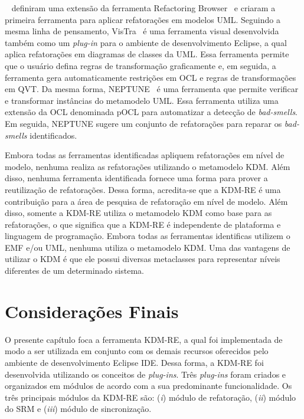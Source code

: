 ~ definiram uma extensão da ferramenta Refactoring Browser~\cite{roberts1997refactoring} e criaram a primeira ferramenta para aplicar refatorações em modelos UML. Seguindo a mesma linha de pensamento,
VisTra~\cite{vstolc2010visual} é uma ferramenta visual desenvolvida também como um \textit{plug-in} para o ambiente de desenvolvimento Eclipse, a qual aplica refatorações em diagramas de classes da UML. Essa ferramenta permite que o usuário defina regras de transformação graficamente e, em seguida, a ferramenta gera automaticamente restrições em OCL e regras de transformações em QVT. Da mesma forma, NEPTUNE~\cite{millan2009ocl} é uma ferramenta que permite verificar e transformar instâncias do metamodelo UML. Essa ferramenta utiliza uma extensão da OCL denominada pOCL para automatizar a detecção de \textit{bad-smells}. Em seguida, NEPTUNE sugere um conjunto de refatorações para reparar os \textit{bad-smells} identificados. 

Embora todas as ferramentas identificadas apliquem refatorações em nível de modelo, nenhuma realiza as refatorações utilizando o metamodelo KDM. Além disso, nenhuma ferramenta identificada fornece uma forma para prover a reutilização de refatorações. Dessa forma, acredita-se que a KDM-RE é uma contribuição para a área de pesquisa de refatoração em nível de modelo. Além disso, somente a KDM-RE utiliza o metamodelo KDM como base para as refatorações, o que significa que a KDM-RE é independente de plataforma e linguagem de programação. Embora todas as ferramentas identificas utilizem o EMF e/ou UML, nenhuma utiliza o metamodelo KDM. Uma das vantagens de utilizar o KDM é que ele possui diversas metaclasses para representar níveis diferentes de um determinado sistema.

\section{Considerações Finais}\label{sec:consideracoes_final_kdm_re}


O presente capítulo foca a ferramenta KDM-RE, a qual foi implementada de modo a ser utilizada em conjunto com os demais recursos oferecidos pelo ambiente de desenvolvimento Eclipse IDE. Dessa forma, a KDM-RE foi desenvolvida utilizando os conceitos de \textit{plug-ins}. Três \textit{plug-ins} foram criados e organizados em módulos de acordo com a sua predominante funcionalidade. Os três principais módulos da KDM-RE são: (\textit{i}) módulo de refatoração, (\textit{ii}) módulo do SRM e (\textit{iii}) módulo de sincronização. 

